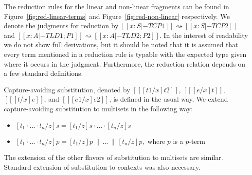 The reduction rules for the linear and non-linear fragments can be
found in Figure~\ref{fig:red-linear-terms} and
Figure~\ref{fig:red-non-linear} respectively.  We denote the judgments
for reduction by $[[x : S |-TC P1]] \rightsquigarrow [[x : S |-TC
    P2]]$ and $[[x : A |-TL D1;P1]] \rightsquigarrow [[x : A |-TL
    D2;P2]]$.  In the interest of readability we do not show full
derivations, but it should be noted that it is assumed that every term
mentioned in a reduction rule is typable with the expected type given
where it occurs in the judgment.  Furthermore, the reduction relation
depends on a few standard definitions.

Capture-avoiding substitution, denoted by $[[ [t1/x]t2]]$, $[[
    [e/x]t]]$, $[[ [t/x]e]]$, and $[[ [e1/x]e2]]$, is defined in the
usual way.  We extend capture-avoiding substitution to multisets in
the following way:
\begin{itemize}
\item $[t_1\cdot\ldots\cdot t_n/ z]s = [t_1/z]s\cdot\ldots\cdot [t_n/ z]s$
\item $[t_1\cdot\ldots\cdot t_n/ z]p = [t_1/z]p\,\|\, \ldots\,\|\, [t_n/ z]p,$ where $p$ is a $p$-term
\end{itemize}
The extension of the other flavors of substitution to multisets are
similar.  Standard extension of substitution to contexts was also
necessary.

